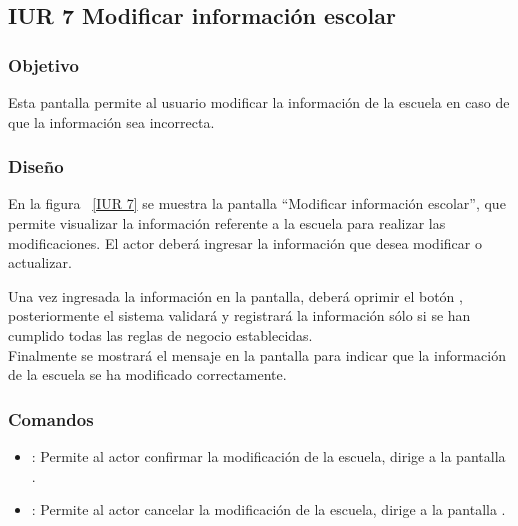\subsection{IUR 7 Modificar información escolar}

\subsubsection{Objetivo}

   Esta pantalla permite al usuario  modificar la información de la escuela en caso de que la información sea incorrecta.

\subsubsection{Diseño}

    
    En la figura ~\ref{IUR 7} se muestra la pantalla ``Modificar información escolar'', que permite visualizar la información referente a la escuela para realizar las modificaciones. El actor deberá ingresar la información que desea modificar o actualizar.
    
    Una vez ingresada la información en la pantalla, deberá oprimir el botón , posteriormente %
    el sistema validará y registrará la información sólo si se han cumplido todas las reglas de negocio establecidas.  \\
    
    Finalmente se mostrará el mensaje  en 
    la pantalla  para indicar que la información de la escuela
    se ha modificado correctamente. 
    

    
\subsubsection{Comandos}
    \begin{itemize}
   \item {}: Permite al actor confirmar la modificación de la escuela, dirige a la pantalla .
    \item {}: Permite al actor cancelar la modificación de la escuela, dirige a la pantalla .
    \end{itemize}

